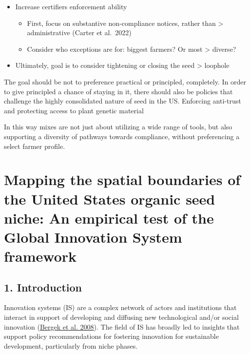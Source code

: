 \documentclass[twoside,12pt,final]{ucthesis-CA2012}
\begin{document}
\begin{ucmainmatter}
\begin{itemize}
\begin{itemize}
  \end{itemize}
\item
  Increase certifiers enforcement ability
  \begin{itemize}
  \item
    First, focus on substantive non-compliance notices, rather than
    \textgreater{} administrative (Carter et al.~2022)
  \item
    Consider who exceptions are for: biggest farmers? Or most
    \textgreater{} diverse?
  \end{itemize}
\item
  Ultimately, goal is to consider tightening or closing the seed
  \textgreater{} loophole
\end{itemize}
The goal should be not to preference practical or principled,
completely. In order to give principled a chance of staying in it, there
should also be policies that challenge the highly consolidated nature of
seed in the US. Enforcing anti-trust and protecting access to plant
genetic material

In this way mixes are not just about utilizing a wide range of tools,
but also supporting a diversity of pathways towards compliance, without
preferencing a select farmer profile.

\hypertarget{mapping-the-spatial-boundaries-of-the-united-states-organic-seed-niche-an-empirical-test-of-the-global-innovation-system-framework}{%
\chapter{Mapping the spatial boundaries of the United State\textquotesingle s organic seed niche: An empirical test of the Global Innovation System framework}\label{mapping-the-spatial-boundaries-of-the-united-states-organic-seed-niche-an-empirical-test-of-the-global-innovation-system-framework}}


\hypertarget{introduction-2}{%
\section{1. Introduction}\label{introduction-2}}

Innovation systems (IS) are a complex network of actors and institutions
that interact in support of developing and diffusing new technological
and/or social innovation
(\protect\hyperlink{ref-Bergek_Jacobsson_Carlsson_Lindmark_Rickne_2008}{Bergek et al. 2008}).
The field of IS has broadly led to insights that support policy
recommendations for fostering innovation for sustainable development,
particularly from \textquotesingle niche\textquotesingle{} phases.


\end{ucmainmatter}
\end{document}

